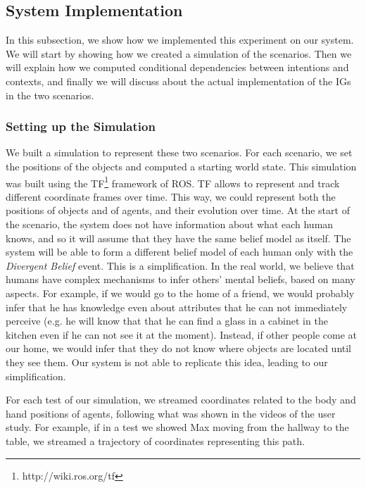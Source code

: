\subsection{System Implementation}
\label{subsec:observer_results-system_implementation}
In this subsection, we show how we implemented this experiment on our system. We will start by showing how we created a simulation of the scenarios. Then we will explain how we computed conditional dependencies between intentions and contexts, and finally we will discuss about the actual implementation of the IGs in the two scenarios.

\subsubsection{Setting up the Simulation}
We built a simulation to represent these two scenarios. For each scenario, we set the positions of the objects and computed a starting world state. This simulation was built using the TF\footnote{http://wiki.ros.org/tf} framework of ROS. TF allows to represent and track different coordinate frames over time. This way, we could represent both the positions of objects and of agents, and their evolution over time.
 At the start of the scenario, the system does not have information about what each human knows, and so it will assume that they have the same belief model as itself. The system will be able to form a different belief model of each human only with the \textit{Divergent Belief} event. This is a simplification. In the real world, we believe that humans have complex mechanisms to infer others' mental beliefs, based on many aspects. For example, if we would go to the home of a friend, we would probably infer that he has knowledge even about attributes that he can not immediately perceive (e.g. he will know that that he can find a glass in a cabinet in the kitchen even if he can not see it at the moment). Instead, if other people come at our home, we would infer that they do not know where objects are located until they see them. Our system is not able to replicate this idea, leading to our simplification.

 For each test of our simulation, we streamed coordinates related to the body and hand positions of agents, following what was shown in the videos of the user study. For example, if in a test we showed Max moving from the hallway to the table, we streamed a trajectory of coordinates representing this path. 

